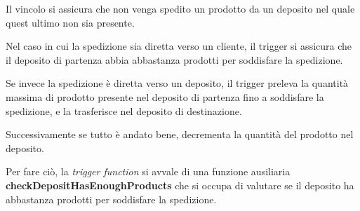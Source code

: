 Il vincolo si assicura che non venga spedito un prodotto da un deposito nel quale quest ultimo non sia presente.

Nel caso in cui la spedizione sia diretta verso un cliente, il trigger si assicura che il deposito di partenza abbia abbastanza prodotti per soddisfare la spedizione.

Se invece la spedizione è diretta verso un deposito, il trigger preleva la quantità massima di prodotto presente nel deposito di partenza fino a soddisfare la spedizione, e la trasferisce nel deposito di destinazione.

Successivamente se tutto è andato bene, decrementa la quantità del prodotto nel deposito.

Per fare ciò, la \textit{trigger function} si avvale di una funzione ausiliaria \textbf{checkDepositHasEnoughProducts} che si occupa di valutare se il deposito ha abbastanza prodotti per soddisfare la spedizione.

\newpage

